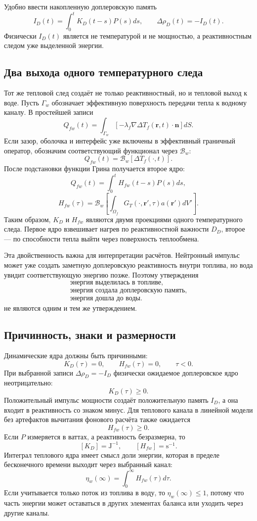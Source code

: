 \documentclass[12pt]{article}
\begin{document}
Удобно ввести накопленную доплеровскую память
\[
I_D(t)=\int_0^tK_D(t-s)P(s)ds,
\qquad
\Delta\rho_D(t)=-I_D(t).
\]
Физически \(I_D(t)\) является не температурой и не мощностью, а реактивностным следом уже выделенной энергии.

\subsection{Два выхода одного температурного следа}

Тот же тепловой след создаёт не только реактивностный, но и тепловой выход к воде. Пусть \(\Gamma_w\) обозначает эффективную поверхность передачи тепла к водному каналу. В простейшей записи
\[
Q_{fw}(t)
=
\int_{\Gamma_w}
\left[-\lambda_f\nabla\Delta T_f(\mathbf r,t)\cdot\mathbf n\right]dS.
\]
Если зазор, оболочка и интерфейс уже включены в эффективный граничный оператор, обозначим соответствующий функционал через \(\mathcal B_w\):
\[
Q_{fw}(t)=\mathcal B_w[\Delta T_f(\cdot,t)].
\]
После подстановки функции Грина получается второе ядро:
\[
Q_{fw}(t)=\int_0^tH_{fw}(t-s)P(s)ds,
\]
\[
\boxed{
H_{fw}(\tau)
=
\mathcal B_w\left[
\int_{\Omega_f}G_T(\cdot,\mathbf r',\tau)a(\mathbf r')dV'
\right].
}
\]
Таким образом, \(K_D\) и \(H_{fw}\) являются двумя проекциями одного температурного следа. Первое ядро взвешивает нагрев по реактивностной важности \(D_D\), второе --- по способности тепла выйти через поверхность теплообмена.

Эта двойственность важна для интерпретации расчётов. Нейтронный импульс может уже создать заметную доплеровскую реактивность внутри топлива, но вода увидит соответствующую энергию позже. Поэтому утверждения
\[
\begin{gathered}
\text{энергия выделилась в топливе},\\
\text{энергия создала доплеровскую память},\\
\text{энергия дошла до воды}.
\end{gathered}
\]
не являются одним и тем же утверждением.

\subsection{Причинность, знаки и размерности}

Динамические ядра должны быть причинными:
\[
K_D(\tau)=0,
\qquad
H_{fw}(\tau)=0,
\qquad
\tau<0.
\]
При выбранной записи \(\Delta\rho_D=-I_D\) физически ожидаемое доплеровское ядро неотрицательно:
\[
K_D(\tau)\ge0.
\]
Положительный импульс мощности создаёт положительную память \(I_D\), а она входит в реактивность со знаком минус. Для теплового канала в линейной модели без артефактов вычитания фонового расчёта также ожидается
\[
H_{fw}(\tau)\ge0.
\]
Если \(P\) измеряется в ваттах, а реактивность безразмерна, то
\[
[K_D]=\mathrm{J}^{-1},
\qquad
[H_{fw}]=\mathrm{s}^{-1}.
\]
Интеграл теплового ядра имеет смысл доли энергии, которая в пределе бесконечного времени выходит через выбранный канал:
\[
\eta_w(\infty)=\int_0^\infty H_{fw}(\tau)d\tau.
\]
Если учитывается только поток из топлива в воду, то \(\eta_w(\infty)\le1\), потому что часть энергии может оставаться в других элементах баланса или уходить через другие каналы.
\end{document}
